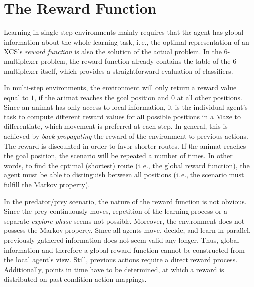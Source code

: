 \section{The Reward Function}
\label{section:the-reward-function}

Learning in single-step environments mainly requires that the agent has global information about the whole learning task, i.\,e., the optimal representation of an XCS's \emph{reward function} is also the solution of the actual problem. In the 6-multiplexer problem, the reward function already contains the table of the 6-multiplexer itself, which provides a straightforward evaluation of classifiers.

In multi-step environments, the environment will only return a reward value equal to $1$, if the animat reaches the goal position and $0$ %
at all other positions. Since an animat has only access to local information, it is the individual agent's task to compute different reward values for all possible positions in a Maze to differentiate, which movement is preferred at each step. In general, this is achieved by \emph{back propagating} the reward of the environment to previous actions. The reward is discounted in order to favor shorter routes. If the animat reaches the goal position, the scenario will be repeated a number of times. In other words, to find the optimal (shortest) route (i.\,e., the global reward function), the agent must be able to distinguish between all positions (i.\,e., the scenario must fulfill the Markov property).

In the predator/prey scenario, the nature of the reward function is not obvious. Since the prey continuously moves, %
repetition of the learning process or a separate \emph{explore phase} seems not possible. Moreover, the environment does not possess the Markov property. Since all agents move, decide, and learn in parallel, previously gathered information does not seem valid any longer. %
Thus, global information and therefore a global reward function cannot be constructed from the local agent's view. Still, previous actions require a direct reward process. Additionally, points in time have to be determined, at which a reward is distributed on past condition-action-mappings.

